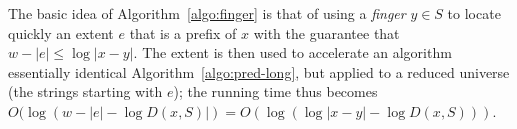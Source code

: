 \documentclass[a4paper,11pt]{article}
\newcommand{\?}{\mskip1.5mu}
\def\..{\,\mathpunct{\ldotp\ldotp}} %
\DeclareMathOperator{\lrange}{left}
\DeclareMathOperator{\rrange}{right}
\DeclareMathOperator{\extent}{extent}
\DeclareMathOperator{\Pref}{Pref}
\DeclareMathOperator{\pred}{pred}
\DeclareMathOperator{\fbs}{FBS}
\begin{document}
The basic idea of Algorithm~\ref{algo:finger} is that of using a \emph{finger}
$y\in S$ to locate quickly an extent $e$ that is a prefix of $x$ with the guarantee that $w-|e|\leq\log|x-y|$. The extent
is then used to accelerate an algorithm essentially identical
Algorithm~\ref{algo:pred-long}, but applied to a reduced universe (the strings
starting with $e$); the running time thus becomes
$O(\log(w-|e|-\log D(x,S)|)=O(\log(\log|x-y|-\log D(x,S)))$.

\end{document}
